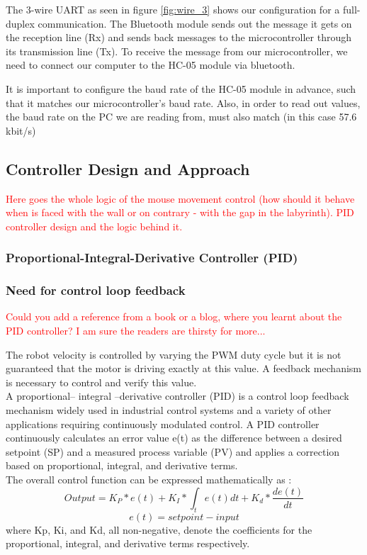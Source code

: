 The 3-wire UART as seen in figure \ref{fig:wire_3} shows our configuration for a full-duplex communication. The Bluetooth module sends out the message it gets on the reception line (Rx) and sends back messages to the microcontroller through its transmission line (Tx). To receive the message from our microcontroller, we need to connect our computer to the HC-05 module via bluetooth.

It is important to configure the baud rate of the HC-05 module in advance, such that it matches our microcontroller's baud rate. Also, in order to read out values, the baud rate on the PC we are reading from, must also match (in this case 57.6 kbit/s)


\subsection{Controller Design and Approach}

\textcolor{red}{
Here goes the whole logic of the mouse movement control (how should it behave when is faced with the wall or on contrary - with the gap in the labyrinth). PID controller design and the logic behind it.
}

\subsubsection{Proportional-Integral-Derivative Controller (PID)}
\subsubsection*{Need for control loop feedback}

\textcolor{red}{Could you add a reference from a book or a blog, where you learnt about the PID controller? I am sure the readers are thirsty for more...}

The robot velocity is controlled by varying the PWM duty cycle but it is not guaranteed that the motor is driving exactly at this value. A feedback mechanism is necessary to control and verify this value.\\
\vskip 0.1in
\noindent
A proportional– integral –derivative controller (PID) is a control loop feedback mechanism widely used in industrial control systems and a variety of other applications requiring continuously modulated control. A PID controller continuously calculates an error value e(t) as the difference between a desired setpoint (SP) and a measured process variable (PV) and applies a correction based on proportional, integral, and derivative terms.\\
The overall control function can be expressed mathematically as :
$$Output = K_{P}*e(t) + K_{I}*\int_t e(t) dt + K_{d}*\frac{d e(t)}{dt} $$
$$e(t) = setpoint - input $$
\noindent
where Kp, Ki, and Kd, all non-negative, denote the coefficients for the proportional, integral, and derivative terms respectively.

